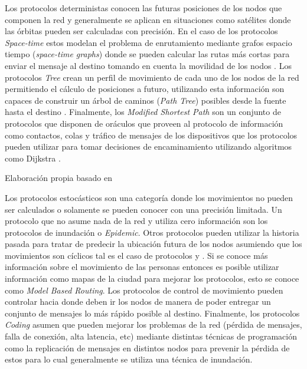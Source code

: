 Los protocolos deterministas conocen las futuras posiciones de los nodos que
componen la red y generalmente se aplican en situaciones como satélites donde
las órbitas pueden ser calculadas con precisión. En el caso de los protocolos
\textit{Space-time} estos modelan el problema de enrutamiento mediante grafos
espacio tiempo (\textit{space-time graphs}) donde se pueden calcular las rutas
más cortas para enviar el mensaje al destino tomando en cuenta la movilidad de
los nodos \cite{space-time}. Los protocolos \textit{Tree} crean un perfil de
movimiento de cada uno de los nodos de la red permitiendo el cálculo de
posiciones a futuro, utilizando esta información son capaces de construir un
árbol de caminos (\textit{Path Tree}) posibles desde la fuente hasta el destino
\cite{DBLP:conf/pervasive/HandoreanGR04}. Finalmente, los \textit{Modified
Shortest Path} son un conjunto de protocolos que disponen de oráculos que
proveen al protocolo de información como contactos, colas y tráfico de mensajes
de los dispositivos que los protocolos pueden utilizar para tomar decisiones de
encaminamiento utilizando algoritmos como Dijkstra
\cite{DBLP:conf/sigcomm/JainFP04}.


{Elaboración propia basado en \cite{DBLP:phd/dnb/Mayer12a}}


Los protocolos estocásticos son una categoría donde los movimientos no pueden
ser calculados o solamente se pueden conocer con una precisión limitada.  Un
protocolo que no asume nada de la red y utiliza cero información son los
protocolos de inundación o \textit{Epidemic}. Otros protocolos pueden utilizar
la historia pasada para tratar de predecir la ubicación futura de los nodos
asumiendo que los movimientos son cíclicos tal es el caso de protocolos
\maxprop{} y \prophet.  Si se conoce más información sobre el movimiento de las
personas entonces es posible utilizar información como mapas de la ciudad para
mejorar los protocolos, esto se conoce como \textit{Model Based Routing}. Los
protocolos de control de movimiento pueden controlar hacia donde deben ir los
nodos de manera de poder entregar un conjunto de mensajes lo más rápido posible
al destino.  Finalmente, los protocolos \textit{Coding} asumen que pueden
mejorar los problemas de la red (pérdida de mensajes, falla de conexión, alta
latencia, etc) mediante distintas técnicas de programación como la replicación
de mensajes en distintos nodos para prevenir la pérdida de estos para lo cual
generalmente se utiliza una técnica de inundación.

